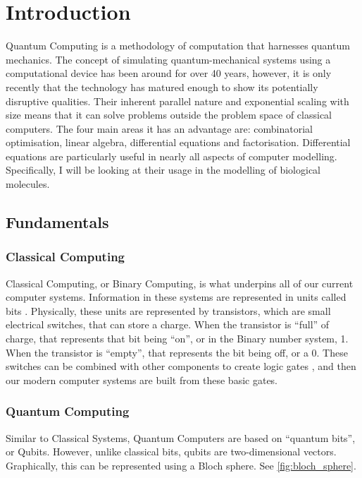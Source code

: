 {}
\section*{Introduction}

Quantum Computing is a methodology of computation that harnesses quantum mechanics. The concept of simulating quantum-mechanical systems using a computational device has been around for over 40 years, \cite{feynman_1982} however, it is only recently that the technology has matured enough to show its potentially disruptive qualities. Their inherent parallel nature and exponential scaling with size means that it can solve problems outside the problem space of classical computers. The four main areas it has an advantage  are: combinatorial optimisation, linear algebra, differential equations and factorisation. Differential equations are particularly useful in nearly all aspects of computer modelling. Specifically, I will be looking at their usage in the modelling of biological molecules.


{}
\subsection*{Fundamentals}

{}
\subsubsection*{Classical Computing}

Classical Computing, or Binary Computing, is what underpins all of our current computer systems. Information in these systems are represented in units called bits \cite{bit_definition}. Physically, these units are represented by transistors, which are small electrical switches, that can store a charge. When the transistor is ``full'' of charge, that represents that bit being ``on'', or in the Binary number system, 1. When the transistor is ``empty'', that represents the bit being off, or a 0. These switches can be combined with other components to create logic gates \cite{logic_gate_definition}, and then our modern computer systems are built from these basic gates.

{}
\subsubsection*{Quantum Computing}
Similar to Classical Systems, Quantum Computers are based on ``quantum bits'', or Qubits. However, unlike classical bits, qubits are two-dimensional vectors. Graphically, this can be represented using a Bloch sphere. See \autoref{fig:bloch_sphere}.

